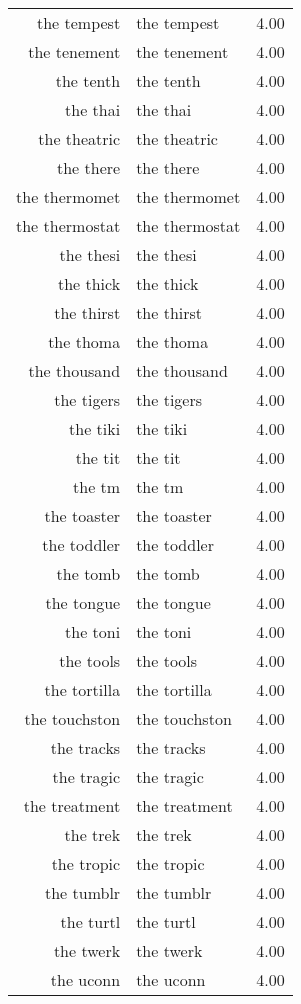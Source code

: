 \begin{table}[ht]
\begin{tabular}{rlr}
  the tempest & the tempest & 4.00 \\ 
  the tenement & the tenement & 4.00 \\ 
  the tenth & the tenth & 4.00 \\ 
  the thai & the thai & 4.00 \\ 
  the theatric & the theatric & 4.00 \\ 
  the there & the there & 4.00 \\ 
  the thermomet & the thermomet & 4.00 \\ 
  the thermostat & the thermostat & 4.00 \\ 
  the thesi & the thesi & 4.00 \\ 
  the thick & the thick & 4.00 \\ 
  the thirst & the thirst & 4.00 \\ 
  the thoma & the thoma & 4.00 \\ 
  the thousand & the thousand & 4.00 \\ 
  the tigers & the tigers & 4.00 \\ 
  the tiki & the tiki & 4.00 \\ 
  the tit & the tit & 4.00 \\ 
  the tm & the tm & 4.00 \\ 
  the toaster & the toaster & 4.00 \\ 
  the toddler & the toddler & 4.00 \\ 
  the tomb & the tomb & 4.00 \\ 
  the tongue & the tongue & 4.00 \\ 
  the toni & the toni & 4.00 \\ 
  the tools & the tools & 4.00 \\ 
  the tortilla & the tortilla & 4.00 \\ 
  the touchston & the touchston & 4.00 \\ 
  the tracks & the tracks & 4.00 \\ 
  the tragic & the tragic & 4.00 \\ 
  the treatment & the treatment & 4.00 \\ 
  the trek & the trek & 4.00 \\ 
  the tropic & the tropic & 4.00 \\ 
  the tumblr & the tumblr & 4.00 \\ 
  the turtl & the turtl & 4.00 \\ 
  the twerk & the twerk & 4.00 \\ 
  the uconn & the uconn & 4.00 \\ 

\end{tabular}
\end{table}
